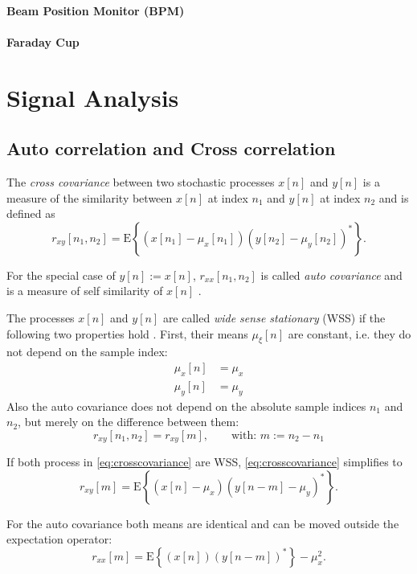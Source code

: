 \paragraph{Beam Position Monitor (BPM)}
\paragraph{Faraday Cup}

\section{Signal Analysis}
\subsection{Auto correlation and Cross correlation}
The \textit{cross covariance} between two stochastic processes $x[n]$ and $y[n]$ is a measure of the similarity between $x[n]$ at index $n_1$ and $y[n]$ at index $n_2$ and is defined as
\begin{equation}\label{eq:crosscovariance}
r_{xy}[n_1,n_2] = \text{E}\left\{(x[n_1]-\mu_x[n_1])(y[n_2]-\mu_y[n_2])^\ast\right\}.
\end{equation}

For the special case of $y[n]:=x[n]$, $r_{xx}[n_1,n_2]$ is called \textit{auto covariance} and is a measure of self similarity of $x[n]$ \cite[p.~172]{Park2017}.

The processes $x[n]$ and $y[n]$ are called \textit{wide sense stationary} (WSS) if the following two properties hold \cite[p.~167]{Park2017}. 
First, their means $\mu_{\xi}[n]$ are constant, i.e. they do not depend on the sample index:
\begin{align}
\mu_{x}[n] &= \mu_x\\
\mu_{y}[n] &= \mu_y
\end{align}
Also the auto covariance does not depend on the absolute sample indices $n_1$ and $n_2$, but merely on the difference between them:
\begin{equation}
r_{xy}[n_1,n_2] = r_{xy}[m],\qquad \text{with: } m:=n_2-n_1
\end{equation}

If both process in \autoref{eq:crosscovariance} are WSS, \autoref{eq:crosscovariance} simplifies to
\begin{equation}
r_{xy}[m] = \text{E}\left\{(x[n]-\mu_x)(y[n-m]-\mu_y)^\ast\right\}.
\end{equation}

For the auto covariance both means are identical and can be moved outside the expectation operator:
\begin{equation}
r_{xx}[m] = \text{E}\left\{(x[n])(y[n-m])^\ast\right\}-\mu_{x}^2.
\end{equation}

